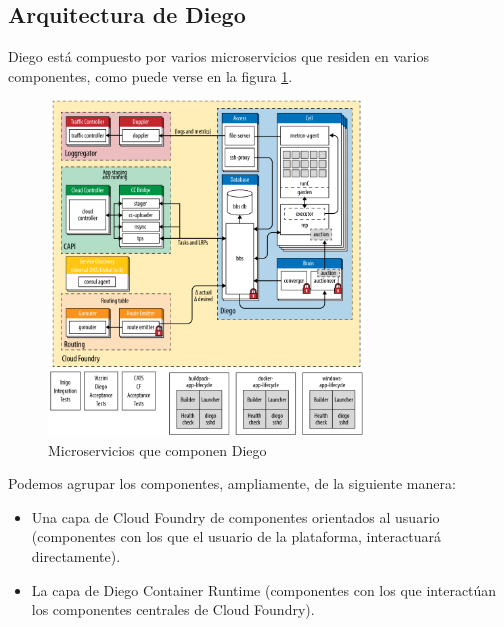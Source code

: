 \documentclass[a4paper,11pt]{article}
\begin{document}
\subsection{Arquitectura de Diego}
Diego está compuesto por varios microservicios que residen en varios componentes, como puede verse en la figura \ref{fig:arqDiego}.
\begin{figure}[h]
    \centering
    \includegraphics[width=0.75\textwidth]{aurora2.png}
    \caption{Microservicios que componen Diego}
    \label{fig:arqDiego}
\end{figure}
Podemos agrupar los componentes, ampliamente, de la siguiente manera:
\begin{itemize}
  \item  Una capa de Cloud Foundry de componentes orientados al usuario (componentes con los que el usuario de la plataforma, interactuará directamente).
\item  La capa de Diego Container Runtime (componentes con los que interactúan los componentes centrales de Cloud Foundry).
\end{itemize}
\end{document}
